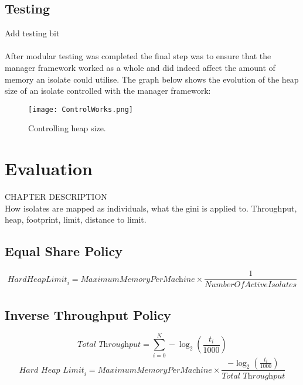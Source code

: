 \documentclass{l4proj}
\begin{document}
\section{Testing}
Add testing bit
\\\\
\hspace*{3em} After modular testing was completed the final step was to ensure that the manager framework worked as a whole and did indeed affect the amount of memory an isolate could utilise. The graph below shows the evolution of the heap size of an isolate controlled with the manager framework:
\begin{figure}[!ht]
  \centering
    \texttt{[image: ControlWorks.png]}
	\caption{Controlling heap size.}
\end{figure}

\chapter{Evaluation}
CHAPTER DESCRIPTION\\
How isolates are mapped as individuals, what the gini is applied to.
Throughput, heap, footprint, limit, distance to limit.
\section{Equal Share Policy}
\begin{equation}
\textit{HardHeapLimit}_i = \textit{MaximumMemoryPerMachine} \times \frac{1}{\textit{NumberOfActiveIsolates}}
\end{equation}
\section{Inverse Throughput Policy}
\begin{equation}
\textit{Total Throughput} = \sum_{i=0}^{N} -\log_2(\frac{t_i}{1000})
\end{equation}
\begin{equation}
\textit{Hard Heap Limit}_i = \textit{MaximumMemoryPerMachine} \times \frac{-\log_2(\frac{t_i}{1000})}{\textit{Total Throughput}}
\end{equation}
\end{document}
